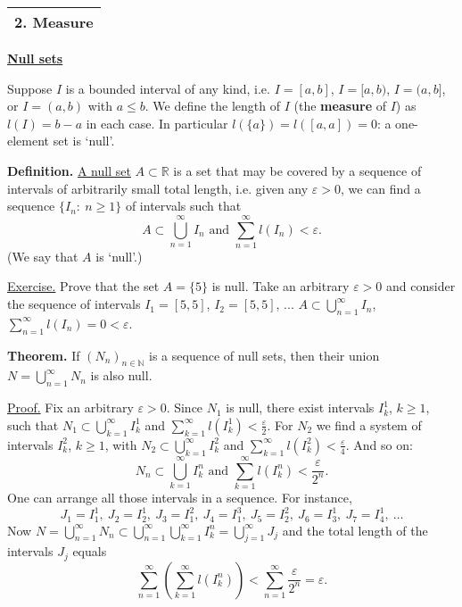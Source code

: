 \documentclass[a4paper,10pt]{article}
\def\NN{\mathbb{N}}
\def\RR{\mathbb{R}}
\newcommand{\1}[1]{\mathbf{1}_{\{#1\}}}
\begin{document}
\begin{tabular}{|l|}
\hline {\LARGE\bf 2. Measure}\\
\hline\end{tabular}
\vspace{5mm}

\begin{center}\bf\underline{Null sets} \end{center}

Suppose $I$ is a bounded interval of any kind, i.e. $I=[a,b]$, $I=[a,b)$, $I=(a,b]$, or $I=(a,b)$ with $a\le b$. We define the length of $I$ (the {\bf measure} of $I$) as $l(I)=b-a$ in each case. In particular $l(\{a\})=l([a,a])=0$: a one-element set is `null'.\vspace{5mm}

{\bf Definition.} \underline{A null set} $A\subset \RR$ is a set that may be covered by a sequence of intervals of arbitrarily small total length, i.e. given any $\varepsilon>0$, we can find a sequence $\{I_n:~n\ge 1\}$ of intervals such that
  $$A\subset \bigcup_{n=1}^\infty I_n \mbox{ and } \sum_{n=1}^\infty l(I_n)<\varepsilon.$$
(We say that $A$ is `null'.)\vspace{3mm}

\underline{Exercise.} Prove that the set $A=\{5\}$ is null. Take an arbitrary $\varepsilon>0$ and consider the sequence of intervals $I_1=[5,5]$, $I_2=[5,5]$, ... $A\subset\bigcup_{n=1}^\infty I_n$, $\sum_{n=1}^\infty l(I_n)=0<\varepsilon$. \vspace{3mm}

{\bf Theorem.} If $(N_n)_{n\in\NN}$ is a sequence of null sets, then their union $N=\bigcup_{n=1}^\infty N_n$ is also null.\vspace{3mm}

\underline{Proof.} Fix an arbitrary $\varepsilon>0$. Since $N_1$ is null, there exist intervals $I^1_k$, $k\ge 1$, such that $N_1\subset\bigcup_{k=1}^\infty I^1_k$ and $\sum_{k=1}^\infty l(I^1_k)<\frac{\varepsilon}{2}$. For $N_2$ we find a system of intervals $I^2_k$, $k\ge 1$, with $N_2\subset\bigcup_{k=1}^\infty I^2_k$ and $\sum_{k=1}^\infty l(I^2_k)<\frac{\varepsilon}{4}$. And so on:
  $$ N_n\subset\bigcup_{k=1}^\infty I^n_k \mbox{ and } \sum_{k=1}^\infty l(I^n_k)<\frac{\varepsilon}{2^n}.$$
One can arrange all those intervals in a sequence. For instance,
  $$J_1=I^1_1,~J_2=I^1_2,~J_3=I^2_1,~ J_4=I^3_1,~ J_5=I^2_2,~ J_6=I^1_3,~ J_7=I^1_4,~\ldots$$
Now $N=\bigcup_{n=1}^\infty N_n\subset \bigcup_{n=1}^\infty\bigcup_{k=1}^\infty I^n_k=\bigcup_{j=1}^\infty J_j$
and the total length of the intervals $J_j$ equals
  $$\sum_{n=1}^\infty\left(\sum_{k=1}^\infty l(I^n_k)\right)<\sum_{n=1}^\infty \frac{\varepsilon}{2^n}=\varepsilon.$$
\blacksquare \vspace{3mm}
\end{document}

